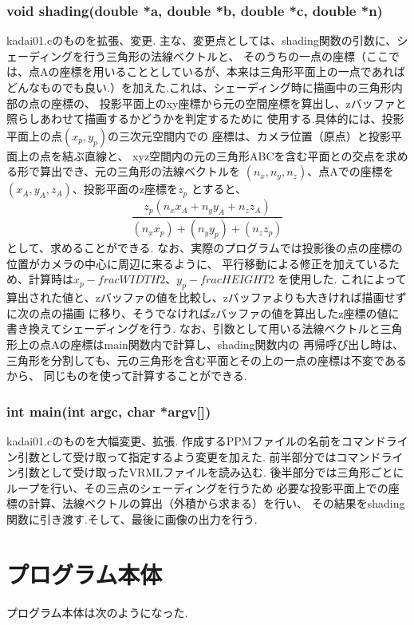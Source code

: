 \documentclass[a4j,dvipdfmx]{jsarticle}
\begin{document}
\subsubsection{void shading(double *a, double *b, double *c, double *n)}
kadai01.cのものを拡張、変更.
主な、変更点としては、shading関数の引数に、シェーディングを行う三角形の法線ベクトルと、
そのうちの一点の座標（ここでは、点Aの座標を用いることとしているが、本来は三角形平面上の一点であれば
  どんなものでも良い.）を加えた.これは、シェーディング時に描画中の三角形内部の点の座標の、
投影平面上のxy座標から元の空間座標を算出し、zバッファと照らしあわせて描画するかどうかを判定するために
使用する.具体的には、投影平面上の点$(x_{p}, y_{p})$の三次元空間内での
座標は、カメラ位置（原点）と投影平面上の点を結ぶ直線と、
xyz空間内の元の三角形ABCを含む平面との交点を求める形で算出でき、元の三角形の法線ベクトルを
$(n_{x}, n_{y}, n_{z})$、点Aでの座標を$(x_{A}, y_{A}, z_{A})$、投影平面のz座標を$z_{p}$
とすると、
\begin{equation}
  \frac{z_{p}(n_{x}x_{A}+n_{y}y_{A}+n_{z}z_{A})}
       {(n_{x}x_{p}) + (n_{y}y_{p}) + (n_{z}z_{p})}
\end{equation}
として、求めることができる.
なお、実際のプログラムでは投影後の点の座標の位置がカメラの中心に周辺に来るように、
平行移動による修正を加えているため、計算時は$x_{p}-frac{WIDTH}{2}$、$y_{p}-frac{HEIGHT}{2}$
を使用した.
これによって算出された値と、zバッファの値を比較し、zバッファよりも大きければ描画せずに次の点の描画
に移り、そうでなければzバッファの値を算出したz座標の値に書き換えてシェーディングを行う.
なお、引数として用いる法線ベクトルと三角形上の点Aの座標はmain関数内で計算し、shading関数内の
再帰呼び出し時は、三角形を分割しても、元の三角形を含む平面とその上の一点の座標は不変であるから、
同じものを使って計算することができる.

\subsubsection{int main(int argc, char *argv[])}
kadai01.cのものを大幅変更、拡張.
作成するPPMファイルの名前をコマンドライン引数として受け取って指定するよう変更を加えた.
前半部分ではコマンドライン引数として受け取ったVRMLファイルを読み込む.
後半部分では三角形ごとにループを行い、その三点のシェーディングを行うため
必要な投影平面上での座標の計算、法線ベクトルの算出（外積から求まる）を行い、
その結果をshading関数に引き渡す.そして、最後に画像の出力を行う.

\section{プログラム本体}
プログラム本体は次のようになった.

\end{document}
